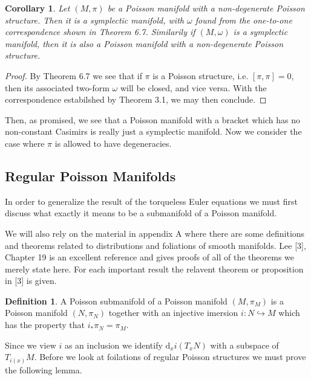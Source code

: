 \documentclass[psamsfonts,12pt]{amsart}
\newcommand\td{\mathrm{d}}
\newcommand\0{\mathbf{0}}
\theoremstyle{plain}
\newtheorem{cor}[thm]{Corollary}
\theoremstyle{definition}
\newtheorem{dfn}[thm]{Definition} %
\begin{document}
\begin{cor}
Let $(M,\pi)$ be a Poisson manifold with a non-degenerate Poisson structure.  Then it is a symplectic manifold, with $\omega$ found from the one-to-one correspondence shown in Theorem 6.7.  Similarily if $(M,\omega)$ is a symplectic manifold, then it is also a Poisson manifold with a non-degenerate Poisson structure.
\end{cor}
\begin{proof}
By Theorem 6.7 we see that if $\pi$ is a Poisson structure, i.e. $[\pi,\pi]=0$, then its associated two-form $\omega$ will be closed, and vice versa.  With the correspondence estabilshed by Theorem 3.1, we may then conclude.
\end{proof}

Then, as promised, we see that a Poisson manifold with a bracket which has no non-constant Casimirs is really just a symplectic manifold.  Now we consider the case where $\pi$ is allowed to have degeneracies.


\subsection{Regular Poisson Manifolds}


In order to generalize the result of the torqueless Euler equations we must first discuss what exactly it means to be a submanifold of a Poisson manifold.  

We will also rely on the material in appendix A where there are some definitions and theorems related to distributions and foliations of smooth manifolds.  Lee [3], Chapter 19 is an excellent reference and gives proofs of all of the theorems we merely state here.  For each important result the relavent theorem or proposition in [3] is given.

\begin{dfn}
A Poisson submanifold of a Poisson manifold $(M,\pi_M)$ is a Poisson manifold $(N,\pi_N)$ together with an injective imersion $i\colon N\hookrightarrow M$ which has the property that $i_*\pi_N =\pi_M$.
\end{dfn}

Since we view $i$ as an inclusion we identify $\td_x i(T_x N)$ with a subspace of $T_{i(x)}M$.  Before we look at foilations of regular Poisson structures we must prove the following lemma.
\end{document}
